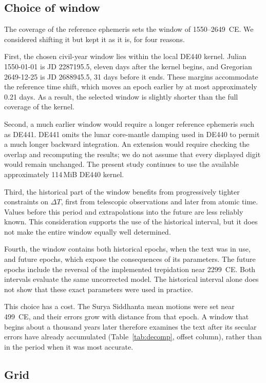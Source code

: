 \documentclass[11pt,a4paper]{article}
\newcommand{\dT}{$\Delta T$}
\begin{document}
\subsection{Choice of window}
\label{sec:window}

The coverage of the reference ephemeris sets the window of 1550--2649~CE. We considered shifting it but kept it as it is, for four reasons.

First, the chosen civil-year window lies within the local DE440 kernel. Julian 1550-01-01 is JD 2287195.5, eleven days after the kernel begins, and Gregorian 2649-12-25 is JD 2688945.5, 31 days before it ends. These margins accommodate the reference time shift, which moves an epoch earlier by at most approximately 0.21 days. As a result, the selected window is slightly shorter than the full coverage of the kernel.

Second, a much earlier window would require a longer reference ephemeris such as DE441. DE441 omits the lunar core-mantle damping used in DE440 to permit a much longer backward integration. An extension would require checking the overlap and recomputing the results; we do not assume that every displayed digit would remain unchanged. The present study continues to use the available approximately 114\,MiB DE440 kernel.

Third, the historical part of the window benefits from progressively tighter constraints on \dT{}, first from telescopic observations and later from atomic time. Values before this period and extrapolations into the future are less reliably known. This consideration supports the use of the historical interval, but it does not make the entire window equally well determined.

Fourth, the window contains both historical epochs, when the text was in use, and future epochs, which expose the consequences of its parameters. The future epochs include the reversal of the implemented trepidation near 2299~CE. Both intervals evaluate the same uncorrected model. The historical interval alone does not show that these exact parameters were used in practice.

This choice has a cost. The Surya Siddhanta mean motions were set near 499~CE, and their errors grow with distance from that epoch. A window that begins about a thousand years later therefore examines the text after its secular errors have already accumulated (Table~\ref{tab:decomp}, offset column), rather than in the period when it was most accurate.

\subsection{Grid}
\label{sec:grid}
\end{document}
